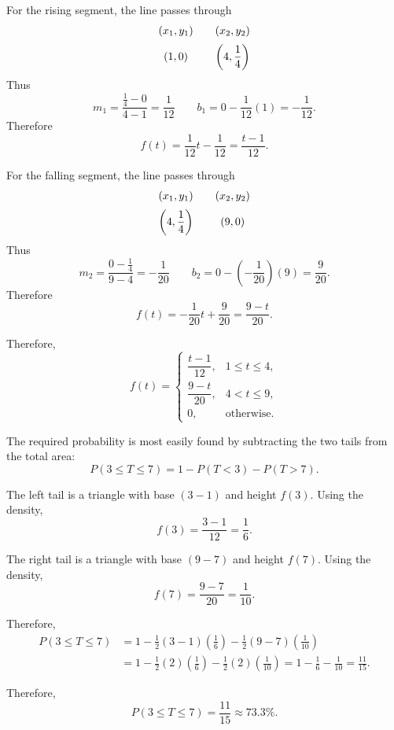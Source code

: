 {		For the rising segment, the line passes through
		\[
		\begin{array}{c@{\qquad}c}
			(x_1,y_1) & (x_2,y_2) \\[2mm]
			\left(1,0\right)
			&
			\left(4,\dfrac14\right)
		\end{array}
		\]
		Thus
		\[
		m_1
		=
		\frac{\frac14-0}{4-1}
		=
		\frac1{12}
		\qquad
		b_1
		=
		0-\frac1{12}(1)
		=
		-\frac1{12}.
		\]
		Therefore
		\[
		f(t)
		=
		\frac1{12}t-\frac1{12}
		=
		\frac{t-1}{12}.
		\]
		
		For the falling segment, the line passes through
		\[
		\begin{array}{c@{\qquad}c}
			(x_1,y_1) & (x_2,y_2) \\[2mm]
			\left(4,\dfrac14\right)
			&
			(9,0)
		\end{array}
		\]
		Thus
		\[
		m_2
		=
		\frac{0-\frac14}{9-4}
		=
		-\frac1{20}
		\qquad
		b_2
		=
		0-\left(-\frac1{20}\right)(9)
		=
		\frac9{20}.
		\]
		Therefore
		\[
		f(t)
		=
		-\frac1{20}t+\frac9{20}
		=
		\frac{9-t}{20}.
		\]
		
		Therefore,
		\[
		f(t)=
		\begin{cases}
			\dfrac{t-1}{12},&1\le t\le4,\\[1mm]
			\dfrac{9-t}{20},&4<t\le9,\\[1mm]
			0,&\text{otherwise.}
		\end{cases}
		\]
		

		The required probability is most easily found by subtracting the two
		tails from the total area:
		\[
		P(3\le T\le7)
		=
		1-P(T<3)-P(T>7).
		\]
		
		The left tail is a triangle with base \((3-1)\) and height \(f(3)\).
		Using the density,
		\[
		f(3)
		=
		\frac{3-1}{12}
		=
		\frac16.
		\]
		
		The right tail is a triangle with base \((9-7)\) and height \(f(7)\).
		Using the density,
		\[
		f(7)
		=
		\frac{9-7}{20}
		=
		\frac1{10}.
		\]
		
		Therefore,
		\[
		\begin{aligned}
			P(3\le T\le7)
			&=
			1
			-
			\frac12(3-1)\left(\frac16\right)
			-
			\frac12(9-7)\left(\frac1{10}\right)
			\\
			& =
			1
			-
			\frac12(2)\left(\frac16\right)
			-
			\frac12(2)\left(\frac1{10}\right) =
			1-\frac16-\frac1{10} = \frac{11}{15}.
		\end{aligned}
		\]
		
		Therefore,
		\[
		\boxed{P(3\le T\le7)=\frac{11}{15}\approx73.3\%}.
		\]
		
		
		\vspace{-5mm}
		
	}
	
